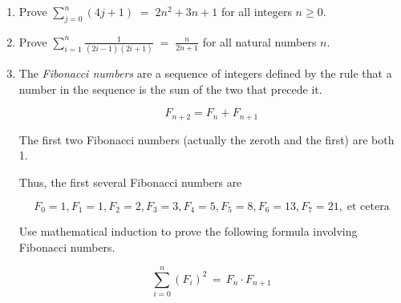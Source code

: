 \begin{enumerate}
{The final line skips over a tiny bit of algebraic detail.  You may feel more comfortable if you fill in those steps.

\newpage
}


\item Prove $\displaystyle \sum_{j=0}^{n}(4j+1) \; = \; 2n^{2}+3n+1$ for all
integers $n \geq 0$.

\wbvfill

\workbookpagebreak

\item Prove $\displaystyle \sum_{i=1}^{n}\frac{1}{(2i-1)(2i+1)} \; = \; \frac{n}{2n+1}$ for all natural numbers $n$.

\wbvfill

\workbookpagebreak

\item The  \emph{Fibonacci numbers} are a sequence of integers defined by
the rule that a number in the sequence is the sum of the two that 
precede it.

\[ F_{n+2} = F_n + F_{n+1}  \]

\noindent The first two Fibonacci numbers (actually the zeroth and the first) 
are both 1.  

\noindent Thus, the first several Fibonacci numbers are

\[ F_0 = 1, F_1=1, F_2=2, F_3=3, F_4=5, F_5=8, F_6=13, F_7=21, \; \mbox{et cetera} \]

Use mathematical induction to prove the following formula involving
Fibonacci numbers.

\[ \sum_{i=0}^n (F_i)^2 \, = \, F_n \cdot F_{n+1} \]

\wbvfill

\workbookpagebreak

\end{enumerate}


